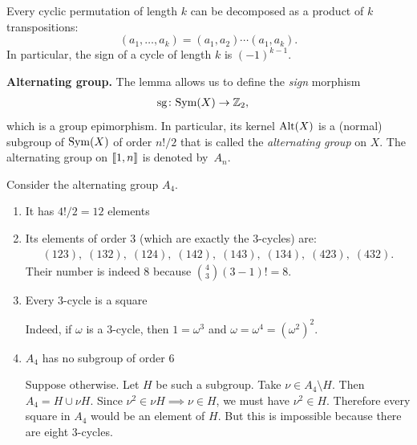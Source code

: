 \begin{rem}\label{rem:cycle-decomposition-and-sign}
    Every cyclic permutation of length $k$ can be decomposed as a product of $k$ transpositions:
    $$
        (a_1,\dots,a_k)=(a_1,a_2)\cdots(a_1,a_k).
    $$
    In particular, the sign of a cycle of length $k$ is $(-1)^{k-1}$.
\end{rem}


{\bf Alternating group.} The lemma allows us to define the \textsl{sign} morphism
\begin{align*}
    \operatorname{sg}\colon{\rm Sym}(X)&\to\mathbb{Z}_2,
\end{align*}
which is a group epimorphism. In particular, its kernel ${\rm Alt}(X)$ is a (normal) subgroup of ${\rm Sym}(X)$ of order $n!/2$ that is called the \textsl{alternating group} on $X$. The alternating group on $\llbracket1,n\rrbracket$ is denoted by~$A_n$.

\begin{xmpl} Consider the alternating group $A_4$.
\begin{enumerate}[$\mbf\rightarrowtriangle$]
    \item It has $4!/2=12$ elements
    
    \item Its elements of order $3$ (which are exactly the $3$-cycles) are:
        \begin{align*}
            (123),\;(132),\;
            (124),\;(142),\;
            (143),\;(134),\;
            (423),\;(432).
        \end{align*}
        Their number is indeed $8$ because $\binom43(3-1)!=8$.
    
    \item Every $3$-cycle is a square
    
    {\upshape Indeed, if $\omega$ is a $3$-cycle, then $1=\omega^3$ and $\omega=\omega^4=(\omega^2)^2$.}

    \item $A_4$ has no subgroup of order $6$
    
    {\upshape Suppose otherwise. Let $H$ be such a subgroup. Take $\nu\in A_4\setminus H$. Then $A_4=H\cup \nu H$. Since $\nu^2\in\nu H\implies\nu\in H$, we must have $\nu^2\in H$. Therefore every square in $A_4$ would be an element of $H$. But this is impossible because there are eight $3$-cycles.}
\end{enumerate}
\end{xmpl}

